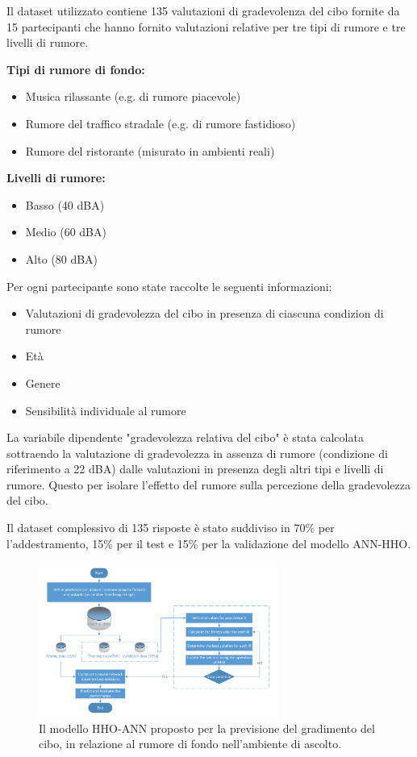 Il dataset utilizzato contiene 135 valutazioni di gradevolenza del cibo fornite da 15 partecipanti che hanno fornito valutazioni relative per tre tipi di rumore e tre livelli di rumore. \cite{Bellmann2019}

\textbf{Tipi di rumore di fondo:}
\begin{itemize}
      \item Musica rilassante (e.g. di rumore piacevole)
      \item Rumore del traffico stradale (e.g. di rumore fastidioso)
      \item Rumore del ristorante (misurato in ambienti reali)
\end{itemize}

\textbf{Livelli di rumore:}
\begin{itemize}
      \item Basso (40 dBA)
      \item Medio (60 dBA)
      \item Alto (80 dBA)
\end{itemize}

Per ogni partecipante sono state raccolte le seguenti informazioni:

\begin{itemize}
      \item Valutazioni di gradevolezza del cibo in presenza di ciascuna condizion di rumore
      \item Età
      \item Genere
      \item Sensibilità individuale al rumore
\end{itemize}

La variabile dipendente "gradevolezza relativa del cibo" è stata calcolata sottraendo la valutazione di gradevolezza in assenza di rumore (condizione di riferimento a 22 dBA) dalle valutazioni in presenza degli altri tipi e livelli di rumore. Questo per isolare l'effetto del rumore sulla percezione della gradevolezza del cibo.

Il dataset complessivo di 135 risposte è stato suddiviso in 70\% per l'addestramento, 15\% per il test e 15\% per la validazione del modello ANN-HHO.

\begin{figure}[H]
      \centering
      \includegraphics[width=0.7\textwidth]{Chapters/Figures/HHO-ANN.png}
      \caption{Il modello HHO-ANN proposto per la previsione del gradimento del cibo, in relazione al rumore di fondo nell'ambiente di ascolto. \cite{alamir2021enhanced}}
      \label{hho-ann}
\end{figure}

